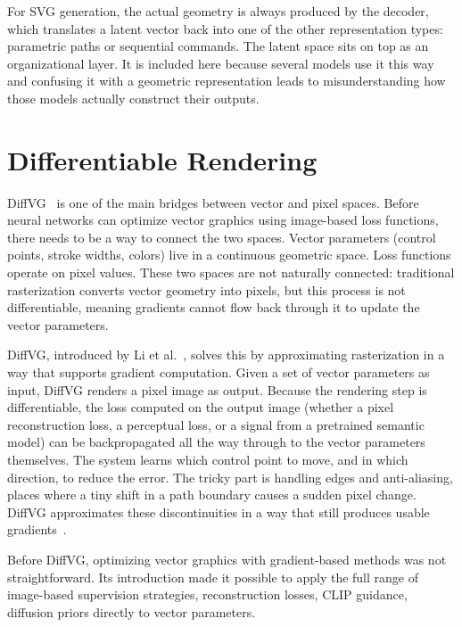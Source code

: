 For SVG generation, the actual geometry is always produced 
by the decoder, which translates a latent vector back into 
one of the other representation types: parametric paths or sequential commands.
The latent space sits on top as an organizational layer. It is included 
here because several models use it this way and confusing 
it with a geometric representation leads to misunderstanding 
how those models actually construct their outputs.



\section{Differentiable Rendering}
\label{sec:diffvg}

DiffVG~\cite{liDifferentiableVectorGraphics2020a} is one of the main bridges between vector and pixel spaces. 
Before neural networks can optimize vector graphics using 
image-based loss functions, there needs to be a way to connect 
the two spaces. Vector parameters (control points, stroke widths, colors) live
in a continuous geometric space. Loss 
functions operate on pixel values. These two spaces are not 
naturally connected: traditional rasterization converts vector 
geometry into pixels, but this process is not differentiable, 
meaning gradients cannot flow back through it to update the 
vector parameters.

DiffVG, introduced by Li et al.~\cite{liDifferentiableVectorGraphics2020a}, 
solves this by approximating rasterization in a way that 
supports gradient computation. Given a set of vector 
parameters as input, DiffVG renders a pixel image as output. 
Because the rendering step is differentiable, the loss computed 
on the output image (whether a pixel reconstruction loss,
a perceptual loss, or a signal from a pretrained semantic model) 
can be backpropagated all the way through to the 
vector parameters themselves. The system learns which control 
point to move, and in which direction, to reduce the error. 
The tricky part is handling edges and anti-aliasing, places 
where a tiny shift in a path boundary causes a sudden pixel 
change. DiffVG approximates these discontinuities in a way 
that still produces usable gradients~\cite{liDifferentiableVectorGraphics2020a}.

Before DiffVG, optimizing vector graphics with gradient-based 
methods was not straightforward. Its introduction made it 
possible to apply the full range of image-based supervision 
strategies, reconstruction losses, CLIP guidance, diffusion 
priors directly to vector parameters.

